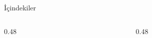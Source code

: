 \documentclass[light]{lutbeamer}
\begin{document}
\begin{frame}{İçindekiler}
  \scriptsize
  \begin{columns}[T]
    \begin{column}{0.48\textwidth}
      \tableofcontents[sections={1-4}]
    \end{column}
    \begin{column}{0.48\textwidth}
      \tableofcontents[sections={5-10}]
    \end{column}
  \end{columns}
\end{frame}



\end{document}
